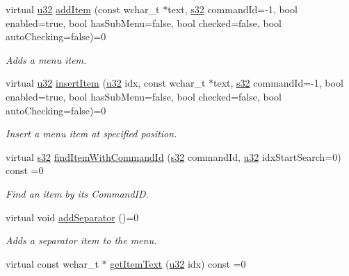 \begin{DoxyCompactItemize}
virtual \hyperlink{namespaceirr_a0416a53257075833e7002efd0a18e804}{u32} \hyperlink{classirr_1_1gui_1_1IGUIContextMenu_afa25240cb37816c3f8941ccc0f2c14ea}{add\+Item} (const wchar\+\_\+t $\ast$text, \hyperlink{namespaceirr_ac66849b7a6ed16e30ebede579f9b47c6}{s32} command\+Id=-\/1, bool enabled=true, bool has\+Sub\+Menu=false, bool checked=false, bool auto\+Checking=false)=0
\begin{DoxyCompactList}\small\item\em Adds a menu item. \end{DoxyCompactList}\item 
virtual \hyperlink{namespaceirr_a0416a53257075833e7002efd0a18e804}{u32} \hyperlink{classirr_1_1gui_1_1IGUIContextMenu_ad4695f88c63ffc09690c5ff682c3aabc}{insert\+Item} (\hyperlink{namespaceirr_a0416a53257075833e7002efd0a18e804}{u32} idx, const wchar\+\_\+t $\ast$text, \hyperlink{namespaceirr_ac66849b7a6ed16e30ebede579f9b47c6}{s32} command\+Id=-\/1, bool enabled=true, bool has\+Sub\+Menu=false, bool checked=false, bool auto\+Checking=false)=0
\begin{DoxyCompactList}\small\item\em Insert a menu item at specified position. \end{DoxyCompactList}\item 
virtual \hyperlink{namespaceirr_ac66849b7a6ed16e30ebede579f9b47c6}{s32} \hyperlink{classirr_1_1gui_1_1IGUIContextMenu_ae7b399d9940ebe566b928517aa150383}{find\+Item\+With\+Command\+Id} (\hyperlink{namespaceirr_ac66849b7a6ed16e30ebede579f9b47c6}{s32} command\+Id, \hyperlink{namespaceirr_a0416a53257075833e7002efd0a18e804}{u32} idx\+Start\+Search=0) const =0
\begin{DoxyCompactList}\small\item\em Find an item by it\textquotesingle{}s Command\+ID. \end{DoxyCompactList}\item 
\mbox{\label{classirr_1_1gui_1_1IGUIContextMenu_a36e2edf23c88eed23d32af1d534d5bfc}} 
virtual void \hyperlink{classirr_1_1gui_1_1IGUIContextMenu_a36e2edf23c88eed23d32af1d534d5bfc}{add\+Separator} ()=0
\begin{DoxyCompactList}\small\item\em Adds a separator item to the menu. \end{DoxyCompactList}\item 
virtual const wchar\+\_\+t $\ast$ \hyperlink{classirr_1_1gui_1_1IGUIContextMenu_a18cf836d001f425f617c5a36db3d1ae6}{get\+Item\+Text} (\hyperlink{namespaceirr_a0416a53257075833e7002efd0a18e804}{u32} idx) const =0

\end{DoxyCompactItemize}
